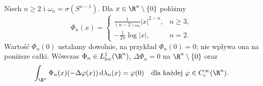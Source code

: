 \begin{twierdzenie}
\label{thm:pde3-phi}
Niech $n\geq2$ i $\omega_n=\sigma(S^{n-1})$. Dla
$x\in\R^n\setminus\{0\}$ połóżmy
\begin{equation}\label{eq:pde3-fundamental}
 \Phi_n(x)=
 \begin{cases}
 \displaystyle\frac{1}{(n-2)\omega_n}|x|^{2-n},&n\geq3,\\[4pt]
 \displaystyle-\frac1{2\pi}\log|x|,&n=2.
 \end{cases}
\end{equation}
Wartość $\Phi_n(0)$ ustalamy dowolnie, na przykład
$\Phi_n(0)=0$; nie wpływa ona na poniższe całki.
Wówczas $\Phi_n\in L^1_{\mathrm{loc}}(\R^n)$,
$\Delta\Phi_n=0$ na $\R^n\setminus\{0\}$ oraz
\begin{equation}\label{eq:pde3-distdelta}
 \int_{\R^n}\Phi_n(x)(-\Delta\varphi(x))\,
 \mathrm d\lambda_n(x)=\varphi(0)
 \quad\text{dla każdej }\varphi\in C_c^\infty(\R^n).
\end{equation}
\end{twierdzenie}
